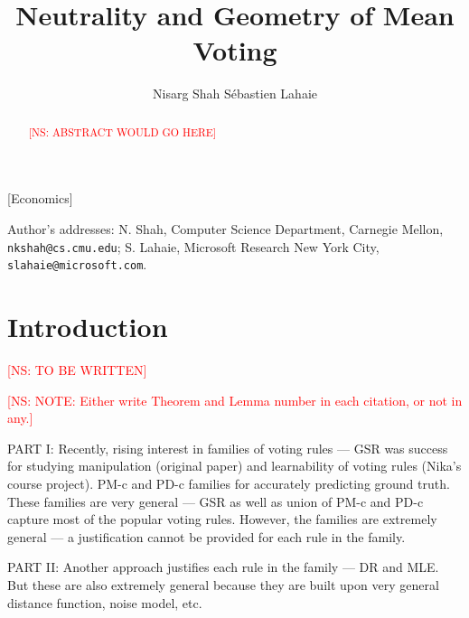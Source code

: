 \documentclass[prodmode,acmec]{ec-acmsmall}
\newcommand{\kibitz}[2]{\ifnum\Comments=1\textcolor{#1}{#2}\fi}
\newcommand{\ns}[1]{\kibitz{red} {[NS: #1]}}
\begin{document}

\title{Neutrality and Geometry of Mean Voting}
\author{
Nisarg Shah
S\'{e}bastien Lahaie
}

\begin{abstract}
\ns{ABSTRACT WOULD GO HERE}
\end{abstract}

[Economics]




\begin{bottomstuff}
Author's addresses:  N. Shah, Computer Science Department, Carnegie Mellon, {\small\tt nkshah@cs.cmu.edu}; S. Lahaie, Microsoft Research New York City, {\small\tt slahaie@microsoft.com}.
\end{bottomstuff}

\maketitle

\section{Introduction}
\label{sec:intro}
\ns{TO BE WRITTEN}

\ns{NOTE: Either write Theorem and Lemma number in each citation, or not in any.}

PART I: Recently, rising interest in families of voting rules --- GSR was success for studying manipulation (original paper) and learnability of voting rules (Nika's course project). PM-c and PD-c families for accurately predicting ground truth. These families are very general --- GSR as well as union of PM-c and PD-c capture most of the popular voting rules. However, the families are extremely general --- a justification cannot be provided for each rule in the family. 

PART II: Another approach justifies each rule in the family --- DR and MLE. But these are also extremely general because they are built upon very general distance function, noise model, etc. 
\end{document}
